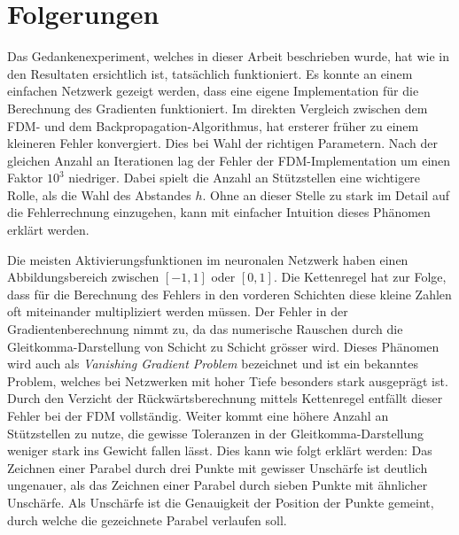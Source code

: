 %
%
%
\section{Folgerungen
\label{ableitung:section:folgerungen}}
Das Gedankenexperiment, welches in dieser Arbeit beschrieben wurde, hat wie in den Resultaten ersichtlich ist, tatsächlich funktioniert. Es konnte an einem einfachen Netzwerk gezeigt werden, dass eine eigene Implementation für die Berechnung des Gradienten funktioniert. Im direkten Vergleich zwischen dem FDM- und dem Backpropagation-Algorithmus, hat ersterer früher zu einem kleineren Fehler konvergiert. Dies bei Wahl der richtigen Parametern. Nach der gleichen Anzahl an Iterationen lag der Fehler der FDM-Implementation um einen Faktor $10^3$ niedriger. Dabei spielt die Anzahl an Stützstellen eine wichtigere Rolle, als die Wahl des Abstandes $h$. Ohne an dieser Stelle zu stark im Detail auf die Fehlerrechnung einzugehen, kann mit einfacher Intuition dieses Phänomen erklärt werden.

Die meisten Aktivierungsfunktionen im neuronalen Netzwerk haben einen Abbildungsbereich zwischen $[-1, 1]$ oder $[0, 1]$. Die Kettenregel hat zur Folge, dass für die Berechnung des Fehlers in den vorderen Schichten diese kleine Zahlen oft miteinander multipliziert werden müssen. Der Fehler in der Gradientenberechnung nimmt zu, da das numerische Rauschen durch die Gleitkomma-Darstellung von Schicht zu Schicht grösser wird. Dieses Phänomen wird auch als \textit{Vanishing Gradient Problem} bezeichnet und ist ein bekanntes Problem, welches bei Netzwerken mit hoher Tiefe besonders stark ausgeprägt ist. Durch den Verzicht der Rückwärtsberechnung mittels Kettenregel entfällt dieser Fehler bei der FDM vollständig. Weiter kommt eine höhere Anzahl an Stützstellen zu nutze, die gewisse Toleranzen in der Gleitkomma-Darstellung weniger stark ins Gewicht fallen lässt. Dies kann wie folgt erklärt werden: Das Zeichnen einer Parabel durch drei Punkte mit gewisser Unschärfe ist deutlich ungenauer, als das Zeichnen einer Parabel durch sieben Punkte mit ähnlicher Unschärfe. Als Unschärfe ist die Genauigkeit der Position der Punkte gemeint, durch welche die gezeichnete Parabel verlaufen soll.

